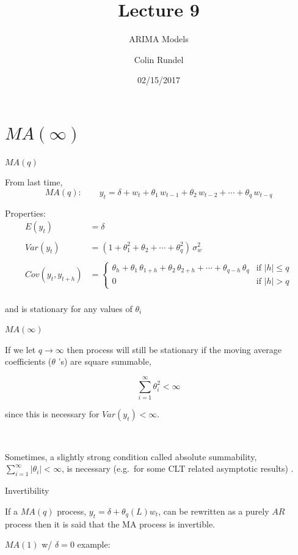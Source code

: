 \documentclass[11pt,ignorenonframetext,]{beamer}
\title{Lecture 9}
\subtitle{ARIMA Models}
\author{Colin Rundel}
\date{02/15/2017}
\begin{document}
\frame{\titlepage}

\section{\texorpdfstring{\(MA(\infty)\)}{MA(\textbackslash{}infty)}}\label{mainfty}

\begin{frame}[t]{\(MA(q)\)}

From last time,
\[ MA(q): \qquad y_t = \delta + w_t + \theta_1 \, w_{t-1} + \theta_2 \, w_{t-2} + \cdots + \theta_q \, w_{t-q} \]

Properties: \[
\begin{aligned}
E(y_t) &= \delta \\
\\
Var(y_t) &= (1 + \theta_1^2 + \theta_2 + \cdots + \theta_q^2) \, \sigma_w^2 \\
\\
Cov(y_t, y_{t+h}) &= 
\begin{cases}
\theta_h + \theta_1 \, \theta_{1+h} + \theta_2 \, \theta_{2+h} + \cdots + \theta_{q-h}\, \theta_{q} & \text{if $|h| \leq q$}\\
0 & \text{if $|h| > q$}
\end{cases}\\
\end{aligned}
\]

and is stationary for any values of \(\theta_i\)

\end{frame}

\begin{frame}[t]{\(MA(\infty)\)}

If we let \(q \to \infty\) then process will still be stationary if the
moving average coefficients (\(\theta\) 's) are square summable,

\[ \sum_{i=1}^\infty \theta_i^2 < \infty \]

since this is necessary for \(Var(y_t) < \infty\).

\(~\)

Sometimes, a slightly strong condition called absolute summability,
\(\sum_{i=1}^\infty |\theta_i| < \infty\), is necessary (e.g.~for some
CLT related asymptotic results) .

\end{frame}

\begin{frame}[t]{Invertibility}

If a \(MA(q)\) process, \(y_t = \delta + \theta_q(L) w_t\), can be
rewritten as a purely \(AR\) process then it is said that the MA process
is invertible.

\(MA(1)\) w/ \(\delta=0\) example:

\end{frame}
\end{document}
